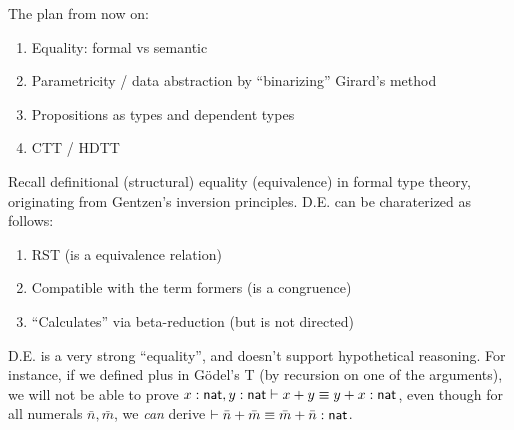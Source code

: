 \documentclass{article}
\begin{document}
The plan from now on:
\begin{enumerate}
\item Equality: formal vs semantic
\item Parametricity / data abstraction by ``binarizing'' Girard's method
\item Propositions as types and dependent types
\item CTT / HDTT
\end{enumerate}

Recall definitional (structural) equality (equivalence) in formal type theory, originating from Gentzen's inversion
principles. D.E. can be charaterized as follows:
\begin{enumerate}
\item RST (is a equivalence relation)
\item Compatible with the term formers (is a congruence)
\item ``Calculates'' via beta-reduction (but is not directed)
\end{enumerate}

D.E. is a very strong ``equality'', and doesn't support hypothetical reasoning. For instance, if we defined plus in
G{\"o}del's T (by recursion on one of the arguments),
we will not be able to prove $\hasEEF{x : \nat, y : \nat}{x + y}{y + x}{\nat}$, even though for all numerals
$\bar n, \bar m$, we \emph{can} derive $\hasEEF{}{\bar n + \bar m}{\bar m + \bar n}{\nat}$.


\end{document}
